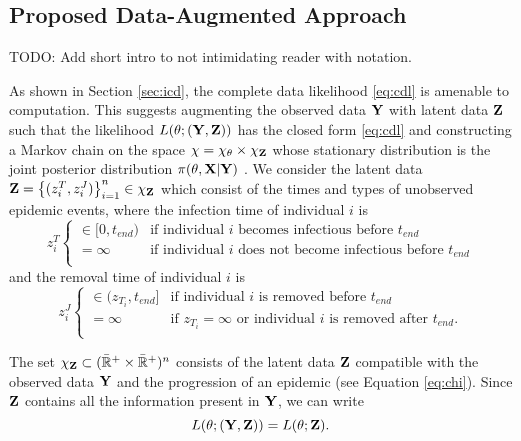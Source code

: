 \documentclass[11pt]{article}
\begin{document}
	
	\subsection{Proposed Data-Augmented Approach}
	\label{sec:con}
	
	TODO: Add short intro to not intimidating reader with notation.
		
	As shown in Section \ref{sec:icd}, the complete data likelihood \ref{eq:cdl} is amenable to computation. This suggests augmenting the observed data $\mathbf{Y}$ with latent data $\mathbf{Z}$ such that the likelihood $L(\theta; (\mathbf{Y}, \mathbf{Z}))$ has the closed form \ref{eq:cdl} and constructing a Markov chain on the space $\chi = \chi_{\theta} \times \chi_{\mathbf{Z}}$ whose stationary distribution is the joint posterior distribution $\pi(\theta, \mathbf{X}|\mathbf{Y})$ \cite{Gibson.1998, ONeill.1999, Fintzi.2017}. We consider the latent data $\mathbf{Z} = \left\lbrace (z^T_i, z^J_i)\right\rbrace_{i=1}^{n} \in \chi_{\mathbf{Z}}$ which consist of the times and types of unobserved epidemic events, where the infection time of individual $i$ is
	$$z^T_i \begin{cases}
		\in [0, t_{end}) & \text{if individual } i \text{ becomes infectious before } t_{end} \\
		= \infty & \text{if individual } i \text{ does not become infectious before } t_{end} \\
	\end{cases}$$
	and the removal time of individual $i$ is
	$$z^J_i \begin{cases}
		\in (z_{T_i}, t_{end}] & \text{if individual } i \text{ is removed before } t_{end} \\
		= \infty & \text{if } z_{T_i} = \infty \text{ or individual } i \text{ is removed after } t_{end}. \\
	\end{cases}$$
 
    The set $\chi_{\mathbf{Z}} \subset (\bar{\mathbb{R}}^+ \times \bar{\mathbb{R}}^+)^n$ consists of the latent data $\mathbf{Z}$ compatible with the observed data $\mathbf{Y}$ and the progression of an epidemic (see Equation \ref{eq:chi}). Since $\mathbf{Z}$ contains all the information present in $\mathbf{Y}$, we can write
	$$L(\theta; (\mathbf{Y}, \mathbf{Z})) = L(\theta; \mathbf{Z}).$$
\end{document}
